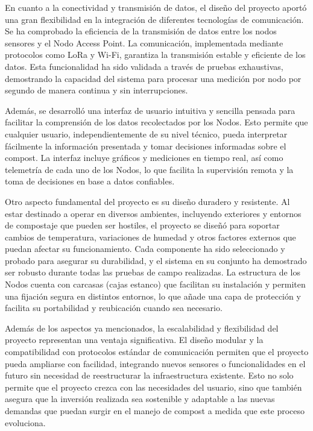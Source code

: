 En cuanto a la conectividad y transmisión de datos, el diseño del proyecto aportó una gran flexibilidad  en la integración de diferentes tecnologías de comunicación. Se ha comprobado la eficiencia de la transmisión de datos entre los nodos sensores y el Nodo Access Point. La comunicación, implementada mediante protocolos como LoRa y Wi-Fi, garantiza la transmisión estable y eficiente de los datos. Esta funcionalidad ha sido validada a través de pruebas exhaustivas, demostrando la capacidad del sistema para procesar una medición por nodo por segundo de manera continua y sin interrupciones.

Además, se desarrolló una interfaz de usuario intuitiva y sencilla pensada para facilitar la comprensión de los datos recolectados por los Nodos. Esto permite que cualquier usuario, independientemente de su nivel técnico, pueda interpretar fácilmente la información presentada y tomar decisiones informadas sobre el compost. La interfaz incluye gráficos y mediciones en tiempo real, así como telemetría de cada uno de los Nodos, lo que facilita la supervisión remota y la toma de decisiones en base a datos confiables.

Otro aspecto fundamental del proyecto es su diseño duradero y resistente. Al estar destinado a operar en diversos ambientes, incluyendo exteriores y entornos de compostaje que pueden ser hostiles, el proyecto se diseñó para soportar cambios de temperatura, variaciones de humedad y otros factores externos que puedan afectar su funcionamiento. Cada componente ha sido seleccionado y probado para asegurar su durabilidad, y el sistema en su conjunto ha demostrado ser robusto durante todas las pruebas de campo realizadas. La estructura de los Nodos cuenta con carcasas (cajas estanco) que facilitan su instalación y permiten una fijación segura en distintos entornos, lo que añade una capa de protección y facilita su portabilidad y reubicación cuando sea necesario.

Además de los aspectos ya mencionados, la escalabilidad y flexibilidad del proyecto representan una ventaja significativa. El diseño modular y la compatibilidad con protocolos estándar de comunicación permiten que el proyecto pueda ampliarse con facilidad, integrando nuevos sensores o funcionalidades en el futuro sin necesidad de reestructurar la infraestructura existente. Esto no solo permite que el proyecto crezca con las necesidades del usuario, sino que también asegura que la inversión realizada sea sostenible y adaptable a las nuevas demandas que puedan surgir en el manejo de compost a medida que este proceso evoluciona.


